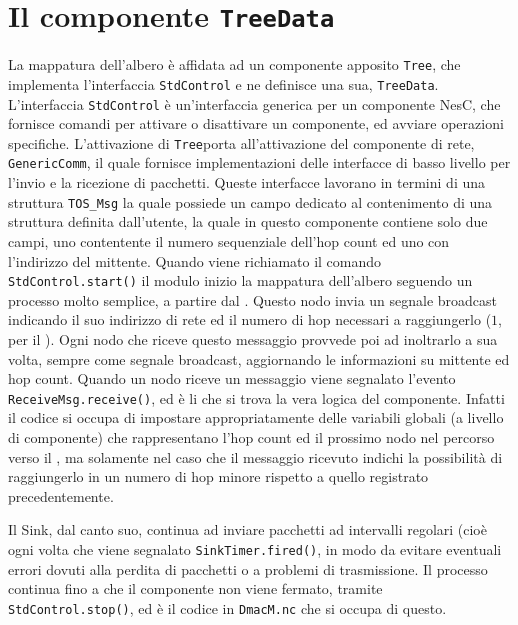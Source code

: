 \documentclass[twoside,11pt,a4paper,italian,openany]{book}
\begin{document}
\newcommand{\treedata}{\texttt{TreeData}}
\newcommand{\tree}{\texttt{Tree}}

\section{Il componente \treedata}
La mappatura dell'albero è affidata ad un componente apposito \tree, che implementa l'interfaccia
\texttt{StdControl} e ne definisce una sua, \treedata.
L'interfaccia \texttt{StdControl} è un'interfaccia generica per un componente NesC, che fornisce 
comandi per attivare o disattivare un componente, ed avviare operazioni specifiche.
L'attivazione di \tree porta all'attivazione del componente di rete, \texttt{GenericComm}, 
il quale fornisce implementazioni delle interfacce di basso livello per l'invio e la ricezione 
di pacchetti. 
Queste interfacce lavorano in termini di una struttura \texttt{TOS\_Msg} la quale possiede un 
campo dedicato al contenimento di una struttura definita dall'utente, la quale in questo
componente contiene solo due campi, uno contentente il numero sequenziale dell'hop count ed uno 
con l'indirizzo del mittente. 
Quando viene richiamato il comando \texttt{StdControl.start()} il modulo inizio la mappatura 
dell'albero seguendo un processo molto semplice, a partire dal \sink. 
Questo nodo invia un segnale broadcast indicando il suo indirizzo di rete ed il numero di hop 
necessari a raggiungerlo ($1$, per il \sink). Ogni nodo che riceve questo messaggio provvede 
poi ad inoltrarlo a sua volta, sempre come segnale broadcast, aggiornando le
informazioni su mittente ed hop count. 
Quando un nodo riceve un messaggio viene segnalato l'evento 
\texttt{ReceiveMsg.receive()}, ed è li che si trova la vera logica del componente. 
Infatti il codice si occupa di impostare appropriatamente delle variabili globali 
(a livello di componente) che rappresentano l'hop count ed il prossimo nodo nel percorso verso 
il \sink, ma solamente nel caso che il messaggio ricevuto indichi la possibilità di raggiungerlo
in un numero di hop minore rispetto a quello registrato precedentemente. 

Il Sink, dal canto suo, continua ad inviare pacchetti ad intervalli regolari (cioè ogni volta 
che viene segnalato \texttt{SinkTimer.fired()}, in modo da evitare eventuali errori dovuti alla 
perdita di pacchetti o a problemi di trasmissione.
Il processo continua fino a che il componente non viene fermato, tramite 
\texttt{StdControl.stop()}, ed è il codice in \texttt{DmacM.nc} che si occupa di questo.
\end{document}
